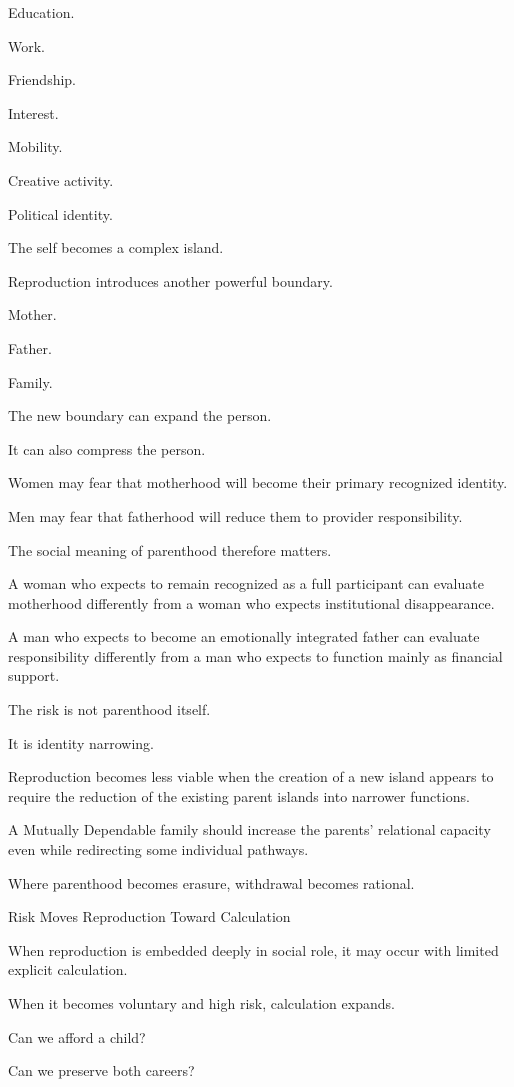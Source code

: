 Education.

Work.

Friendship.

Interest.

Mobility.

Creative activity.

Political identity.

The self becomes a complex island.

Reproduction introduces another powerful boundary.

Mother.

Father.

Family.

The new boundary can expand the person.

It can also compress the person.

Women may fear that motherhood will become their primary recognized identity.

Men may fear that fatherhood will reduce them to provider responsibility.

The social meaning of parenthood therefore matters.

A woman who expects to remain recognized as a full participant can evaluate motherhood differently from a woman who expects institutional disappearance.

A man who expects to become an emotionally integrated father can evaluate responsibility differently from a man who expects to function mainly as financial support.

The risk is not parenthood itself.

It is identity narrowing.

Reproduction becomes less viable when the creation of a new island appears to require the reduction of the existing parent islands into narrower functions.

A Mutually Dependable family should increase the parents’ relational capacity even while redirecting some individual pathways.

Where parenthood becomes erasure, withdrawal becomes rational.

Risk Moves Reproduction Toward Calculation

When reproduction is embedded deeply in social role, it may occur with limited explicit calculation.

When it becomes voluntary and high risk, calculation expands.

Can we afford a child?

Can we preserve both careers?

